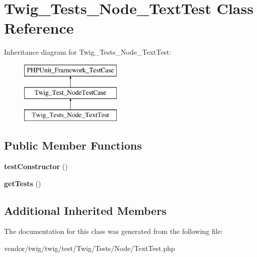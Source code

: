 \hypertarget{classTwig__Tests__Node__TextTest}{}\section{Twig\+\_\+\+Tests\+\_\+\+Node\+\_\+\+Text\+Test Class Reference}
\label{classTwig__Tests__Node__TextTest}
Inheritance diagram for Twig\+\_\+\+Tests\+\_\+\+Node\+\_\+\+Text\+Test\+:\begin{figure}[H]
\begin{center}
\leavevmode
\includegraphics[height=3.000000cm]{classTwig__Tests__Node__TextTest}
\end{center}
\end{figure}
\subsection*{Public Member Functions}
\begin{DoxyCompactItemize}
\item 
{\bfseries test\+Constructor} ()\hypertarget{classTwig__Tests__Node__TextTest_a6456782d12b3687246147abe375fa6f4}{}\label{classTwig__Tests__Node__TextTest_a6456782d12b3687246147abe375fa6f4}

\item 
{\bfseries get\+Tests} ()\hypertarget{classTwig__Tests__Node__TextTest_a5a9aa3298a514e981f0424b23b7d6129}{}\label{classTwig__Tests__Node__TextTest_a5a9aa3298a514e981f0424b23b7d6129}

\end{DoxyCompactItemize}
\subsection*{Additional Inherited Members}


The documentation for this class was generated from the following file\+:\begin{DoxyCompactItemize}
\item 
vendor/twig/twig/test/\+Twig/\+Tests/\+Node/Text\+Test.\+php\end{DoxyCompactItemize}
